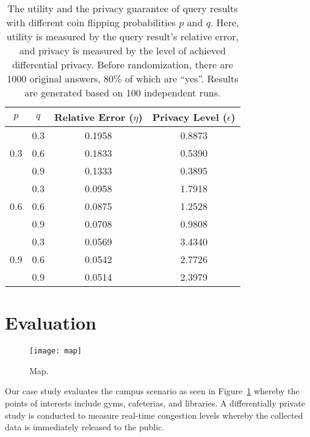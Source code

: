 \documentclass[conference]{IEEEtran}
\begin{document}
\begin{table}[t!]
\small
\centering
\begin{tabular}{c|c|c|c}
\hline $p$ & $q$ & Relative Error ($\eta$) & Privacy Level ($\epsilon$) \\
\hline
\hline \multirow{3}{*}{0.3} & 0.3 & 0.1958 & 0.8873\\
  & 0.6 & 0.1833 & 0.5390\\
  & 0.9 & 0.1333 & 0.3895\\
\hline \multirow{3}{*}{0.6} & 0.3 & 0.0958 & 1.7918\\
  & 0.6 & 0.0875 & 1.2528\\
  & 0.9 & 0.0708 & 0.9808\\
\hline \multirow{3}{*}{0.9} & 0.3 & 0.0569 & 3.4340 \\
  & 0.6 & 0.0542 & 2.7726\\
  & 0.9 & 0.0514 & 2.3979\\
\hline
\end{tabular}
\vspace{-2mm}
\caption{The utility and the privacy guarantee of query results with different coin flipping probabilities $p$ and $q$.  Here, utility is measured by the query result's relative error, and privacy is measured by the level of achieved differential privacy.  Before randomization, there are 1000 original answers, 80\% of which are ``yes''.  Results are generated based on 100 independent runs.}
\vspace{-2.5mm}
\label{tab:utility-privacy}
\end{table}
 \section{Evaluation}

\begin{figure}[t!]
\centering
\texttt{[image: map]}
\caption{Map.}
\label{fig:map}
\end{figure}

Our case study evaluates the campus scenario as seen in Figure~\ref{fig:map} whereby the points of interests include gyms, cafeterias, and libraries.  A differentially private study is conducted to measure real-time congestion levels whereby the collected data is immediately released to the public.
\end{document}

